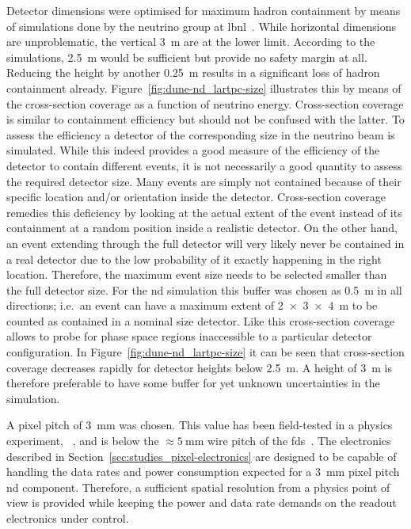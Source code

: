 Detector dimensions were optimised for maximum hadron containment by means of simulations done by the neutrino group at \gls{lbnl}~\cite{lartpcSizeChris}.
While horizontal dimensions are unproblematic, the vertical \SI{3}{\metre} are at the lower limit.
According to the simulations, \SI{2.5}{\metre} would be sufficient but provide no safety margin at all.
Reducing the height by another \SI{0.25}{\metre} results in a significant loss of hadron containment already.
Figure~\ref{fig:dune-nd_lartpc-size} illustrates this by means of the cross-section coverage as a function of neutrino energy.
Cross-section coverage is similar to containment efficiency but should not be confused with the latter.
To assess the efficiency a detector of the corresponding size in the neutrino beam is simulated.
While this indeed provides a good measure of the efficiency of the detector to contain different events, it is not necessarily a good quantity to assess the required detector size.
Many events are simply not contained because of their specific location and/or orientation inside the detector.
Cross-section coverage remedies this deficiency by looking at the actual extent of the event instead of its containment at a random position inside a realistic detector.
On the other hand, an event extending through the full detector will very likely never be contained in a real detector due to the low probability of it exactly happening in the right location.
Therefore, the maximum event size needs to be selected smaller than the full detector size.
For the \gls{nd} simulation this buffer was chosen as \SI{0.5}{\metre} in all directions; i.e.\ an event can have a maximum extent of \SI{2 x 3 x 4}{\metre} to be counted as contained in a nominal size detector.
Like this cross-section coverage allows to probe for phase space regions inaccessible to a particular detector configuration.
In Figure~\ref{fig:dune-nd_lartpc-size} it can be seen that cross-section coverage decreases rapidly for detector heights below \SI{2.5}{\metre}.
A height of \SI{3}{\metre} is therefore preferable to have some buffer for yet unknown uncertainties in the simulation.

A pixel pitch of \SI{3}{\milli\metre} was chosen.
This value has been field-tested in a physics experiment, \uboone{}~\cite{uboone}, and is below the $\approx \SI{5}{\milli\metre}$ wire pitch of the \dune{} \glspl{fd}~\cite{dune4}.
The \larpix{} electronics described in Section~\ref{sec:studies_pixel-electronics} are designed to be capable of handling the data rates and power consumption expected for a \SI{3}{\milli\metre} pixel pitch \AC{} \gls{nd} component.
Therefore, a sufficient spatial resolution from a physics point of view is provided while keeping the power and data rate demands on the readout electronics under control.

